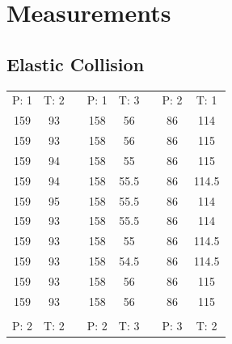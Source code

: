 \documentclass{scrreprt}
\begin{document}
\section{Measurements}
\subsection{Elastic Collision}
\begin{table}[H]
	\centering
	\begin{tabular}{ccp{1.5cm}ccp{1.5cm}cc}
 P: 1 &   T: 2 &            &  P: 1 &   T: 3 &            &  P: 2 &   T: 1 \\\cline{1-2}\cline{4-5}\cline{7-8}

     159 &         93 &            &      158 &         56 &            &         86 &         114 \\
     159 &         93 &            &      158 &         56 &            &         86 &         115 \\
     159 &         94 &            &      158 &         55 &            &         86 &         115 \\
     159 &         94 &            &      158 &         55.5 &          &         86 &         114.5 \\
     159 &         95 &            &      158 &         55.5 &          &         86 &         114 \\
     159 &         93 &            &      158 &         55.5 &          &         86 &         114 \\
     159 &         93 &            &      158 &         55 &            &         86 &         114.5 \\
     159 &         93 &            &      158 &         54.5 &          &         86 &         114.5 \\
     159 &         93 &            &      158 &         56 &            &         86 &         115 \\
     159 &         93 &            &      158 &         56 &            &         86 &         115 \\
         &            &            &            &            &            &            &            \\

 P: 2 &   T: 2 &            &  P: 2 &   T: 3 &            &  P: 3 &   T: 2 \\\cline{1-2}\cline{4-5}\cline{7-8}


\end{tabular}
\end{table}
\end{document}
